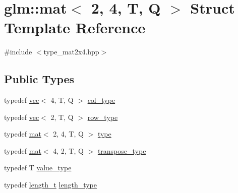 \hypertarget{structglm_1_1mat_3_012_00_014_00_01_t_00_01_q_01_4}{}\section{glm\+:\+:mat$<$ 2, 4, T, Q $>$ Struct Template Reference}
\label{structglm_1_1mat_3_012_00_014_00_01_t_00_01_q_01_4}


{\ttfamily \#include $<$type\+\_\+mat2x4.\+hpp$>$}

\subsection*{Public Types}
\begin{DoxyCompactItemize}
\item 
typedef \hyperlink{structglm_1_1vec}{vec}$<$ 4, T, Q $>$ \hyperlink{structglm_1_1mat_3_012_00_014_00_01_t_00_01_q_01_4_ae14ad10a9d8ce3908ec89ae373a27872}{col\+\_\+type}
\item 
typedef \hyperlink{structglm_1_1vec}{vec}$<$ 2, T, Q $>$ \hyperlink{structglm_1_1mat_3_012_00_014_00_01_t_00_01_q_01_4_af7681d37f1454b1e18754262a65eb6d1}{row\+\_\+type}
\item 
typedef \hyperlink{structglm_1_1mat}{mat}$<$ 2, 4, T, Q $>$ \hyperlink{structglm_1_1mat_3_012_00_014_00_01_t_00_01_q_01_4_a04c04d7f08549f03063d04bca3a76ae5}{type}
\item 
typedef \hyperlink{structglm_1_1mat}{mat}$<$ 4, 2, T, Q $>$ \hyperlink{structglm_1_1mat_3_012_00_014_00_01_t_00_01_q_01_4_a5030a7f34454a6871ed17c1b27cc0929}{transpose\+\_\+type}
\item 
typedef T \hyperlink{structglm_1_1mat_3_012_00_014_00_01_t_00_01_q_01_4_a837bd82ca90340b03c7ee19f598c5133}{value\+\_\+type}
\item 
typedef \hyperlink{namespaceglm_a090a0de2260835bee80e71a702492ed9}{length\+\_\+t} \hyperlink{structglm_1_1mat_3_012_00_014_00_01_t_00_01_q_01_4_a5295c484627e965d615f3367c2ca45d8}{length\+\_\+type}
\end{DoxyCompactItemize}
